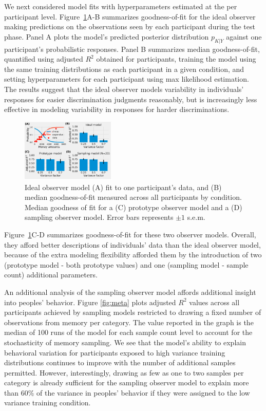 \documentclass[10pt,letterpaper]{article}
\begin{document}
We next considered model fits with hyperparameters estimated at the per participant level. Figure~\ref{fig:ideal}A-B summarizes goodness-of-fit for the ideal observer making predictions on the observations seen by each participant during the test phase. Panel A plots the model's predicted posterior distribution $p_{K|Y}$ against one participant's probabilistic responses. Panel B summarizes median goodness-of-fit, quantified using adjusted $R^2$ obtained for participants, training the model using the same training distributions as each participant in a given condition, and setting hyperparameters for each participant using max likelihood estimation. The results suggest that the ideal observer models variability in individuals' responses for easier discrimination judgments reasonably, but is increasingly less effective in modeling variability in responses for harder discriminations. 

\begin{figure}[h!]
    \centering
    \includegraphics[width=0.4\textwidth]{results/ideal.pdf}
    \caption{Ideal observer model (A) fit to one participant's data, and (B) median goodness-of-fit measured across all participants by condition. Median goodness of fit for a (C) prototype observer model and a (D) sampling observer model. Error bars represents $\pm 1$ s.e.m.} 
    \label{fig:ideal}
\end{figure}

Figure~\ref{fig:ideal}C-D summarizes goodness-of-fit for these two observer models. Overall, they afford better descriptions of individuals' data than the ideal observer model, because of the extra modeling flexibility afforded them by the introduction of two (prototype model - both prototype values) and one (sampling model - sample count) additional parameters. 

An additional analysis of the sampling observer model affords additional insight into peoples' behavior. Figure \ref{fig:meta} plots adjusted $R^2$ values across all participants achieved by sampling models restricted to drawing a fixed number of observations from memory per category. The value reported in the graph is the median of 100 runs of the model for each sample count level to account for the stochasticity of memory sampling. We see that the model's ability to explain behavioral variation for participants exposed to high variance training distributions continues to improve with the number of additional samples permitted. However, interestingly, drawing as few as one to two samples per category is already sufficient for the sampling observer model to explain more than 60\% of the variance in peoples' behavior if they were assigned to the low variance training condition.   
\end{document}

